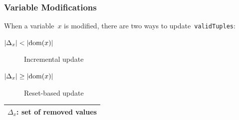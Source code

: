 \documentclass{beamer}
\newcommand{\Dom}[1]{\text{dom}({#1})}
\newcommand{\CurrTable}{\texttt{validTuples}}
\begin{document}


\begin{frame}
  \frametitle{Variable Modifications}
  When a variable~$x$ is modified, there are two ways to update~\CurrTable:
  \smallskip
  \begin{description}
    \item[$\Cardinality{\Delta_x} < \Cardinality{\Dom{x}}$] Incremental update
    \item[$\Cardinality{\Delta_x} \geq \Cardinality{\Dom{x}}$] Reset-based update
  \end{description}

  \bigskip
  \bigskip

  \begin{tabular}{|c|}
    \hline
    $\Delta_x$: set of removed values \\
    \hline
  \end{tabular}

\end{frame}
\end{document}
